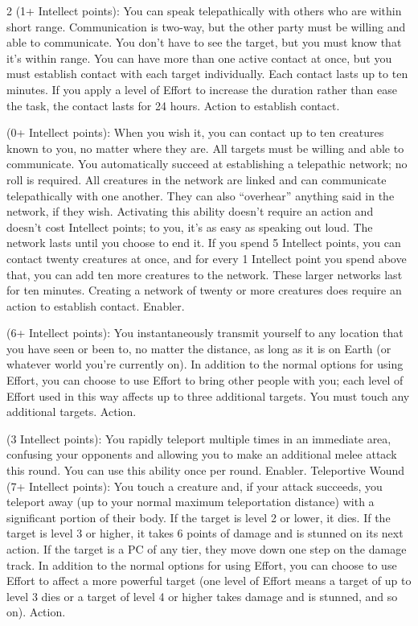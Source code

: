 \begin{multicols}{2}
 (1+ Intellect points): You can speak telepathically with others who are within short range. Communication is two-way, but the other party must be willing and able to communicate. You don’t have to see the target, but you must know that it’s within range. You can have more than one active contact at once, but you must establish contact with each target individually. Each contact lasts up to ten minutes. If you apply a level of Effort to increase the duration rather than ease the task, the contact lasts for 24 hours. Action to establish contact. 
 
 (0+ Intellect points): When you wish it, you can contact up to ten creatures known to you, no matter where they are. All targets must be willing and able to communicate. You automatically succeed at establishing a telepathic network; no roll is required. All creatures in the network are linked and can communicate telepathically with one another. They can also “overhear” anything said in the network, if they wish. Activating this ability doesn’t require an action and doesn’t cost Intellect points; to you, it’s as easy as speaking out loud. The network lasts until you choose to end it. If you spend 5 Intellect points, you can contact twenty creatures at once, and for every 1 Intellect point you spend above that, you can add ten more creatures to the network. These larger networks last for ten minutes. Creating a network of twenty or more creatures does require an action to establish contact. Enabler. 
 
 (6+ Intellect points): You instantaneously transmit yourself to any location that you have seen or been to, no matter the distance, as long as it is on Earth (or whatever world you’re currently on). In addition to the normal options for using Effort, you can choose to use Effort to bring other people with you; each level of Effort used in this way affects up to three additional targets. You must touch any additional targets. Action. 
 
 (3 Intellect points): You rapidly teleport multiple times in an immediate area, confusing your opponents and allowing you to make an additional melee attack this round. You can use this ability once per round. Enabler.
Teleportive Wound (7+ Intellect points): You touch a creature and, if your attack succeeds, you teleport away (up to your normal maximum teleportation distance) with a significant portion of their body. If the target is level 2 or lower, it dies. If the target is level 3 or higher, it takes 6 points of damage and is stunned on its next action. If the target is a PC of any tier, they move down one step on the damage track. In addition to the normal options for using Effort, you can choose to use Effort to affect a more powerful target (one level of Effort means a target of up to level 3 dies or a target of level 4 or higher takes damage and is stunned, and so on). Action.


\end{multicols}
